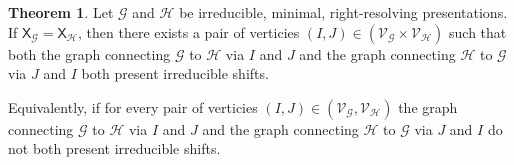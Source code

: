 \documentclass{article}
\newcommand{\Gc}{\mathcal{G}}  %
\newcommand{\Hc}{\mathcal{H}}  %
\newcommand{\Vc}{\mathcal{V}}
\newcommand{\shift}[1]{\mathsf{X}_{#1}}
\theoremstyle{definition}
\newtheorem{theorem}{Theorem}
\begin{document}
    \begin{theorem}
        Let \(\Gc\) and \(\Hc\) be irreducible, minimal, right-resolving presentations. 
        If \(\shift{\Gc} = \shift{\Hc}\), then there exists a pair
        of verticies \((I, J) \in (\Vc_\Gc \times \Vc_\Hc)\) such that both the graph connecting \(\Gc\) to \(\Hc\) via 
        \(I\) and \(J\) and the graph connecting \(\Hc\) to \(\Gc\) via \(J\) and \(I\) both 
        present irreducible shifts.

        Equivalently, if for every pair of verticies \((I, J) \in (\Vc_\Gc, \Vc_\Hc)\) 
        the graph connecting \(\Gc\) to \(\Hc\) via \(I\) and \(J\) 
        and the graph connecting \(\Hc\) to \(\Gc\) via \(J\) and \(I\)
        do not both present irreducible shifts.
    \end{theorem}
\end{document}
